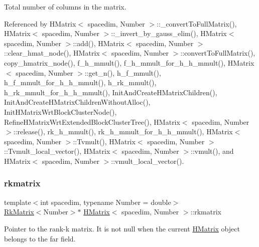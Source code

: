 Total number of columns in the matrix. 

Referenced by H\+Matrix$<$ spacedim, Number $>$\+::\+\_\+convert\+To\+Full\+Matrix(), H\+Matrix$<$ spacedim, Number $>$\+::\+\_\+invert\+\_\+by\+\_\+gauss\+\_\+elim(), H\+Matrix$<$ spacedim, Number $>$\+::add(), H\+Matrix$<$ spacedim, Number $>$\+::clear\+\_\+hmat\+\_\+node(), H\+Matrix$<$ spacedim, Number $>$\+::convert\+To\+Full\+Matrix(), copy\+\_\+hmatrix\+\_\+node(), f\+\_\+h\+\_\+mmult(), f\+\_\+h\+\_\+mmult\+\_\+for\+\_\+h\+\_\+h\+\_\+mmult(), H\+Matrix$<$ spacedim, Number $>$\+::get\+\_\+n(), h\+\_\+f\+\_\+mmult(), h\+\_\+f\+\_\+mmult\+\_\+for\+\_\+h\+\_\+h\+\_\+mmult(), h\+\_\+rk\+\_\+mmult(), h\+\_\+rk\+\_\+mmult\+\_\+for\+\_\+h\+\_\+h\+\_\+mmult(), Init\+And\+Create\+H\+Matrix\+Children(), Init\+And\+Create\+H\+Matrix\+Children\+Without\+Alloc(), Init\+H\+Matrix\+Wrt\+Block\+Cluster\+Node(), Refine\+H\+Matrix\+Wrt\+Extended\+Block\+Cluster\+Tree(), H\+Matrix$<$ spacedim, Number $>$\+::release(), rk\+\_\+h\+\_\+mmult(), rk\+\_\+h\+\_\+mmult\+\_\+for\+\_\+h\+\_\+h\+\_\+mmult(), H\+Matrix$<$ spacedim, Number $>$\+::\+Tvmult(), H\+Matrix$<$ spacedim, Number $>$\+::\+Tvmult\+\_\+local\+\_\+vector(), H\+Matrix$<$ spacedim, Number $>$\+::vmult(), and H\+Matrix$<$ spacedim, Number $>$\+::vmult\+\_\+local\+\_\+vector().

\mbox{\label{classHMatrix_aa97a8f5e42aba0f1d5faf41f35a27819}} 
\subsubsection{\texorpdfstring{rkmatrix}{rkmatrix}}
{\footnotesize\ttfamily template$<$int spacedim, typename Number = double$>$ \\
\hyperlink{classRkMatrix}{Rk\+Matrix}$<$Number$>$$\ast$ \hyperlink{classHMatrix}{H\+Matrix}$<$ spacedim, Number $>$\+::rkmatrix\hspace{0.3cm}{\ttfamily [private]}}

Pointer to the rank-\/k matrix. It is not null when the current \hyperlink{classHMatrix}{H\+Matrix} object belongs to the far field. 

